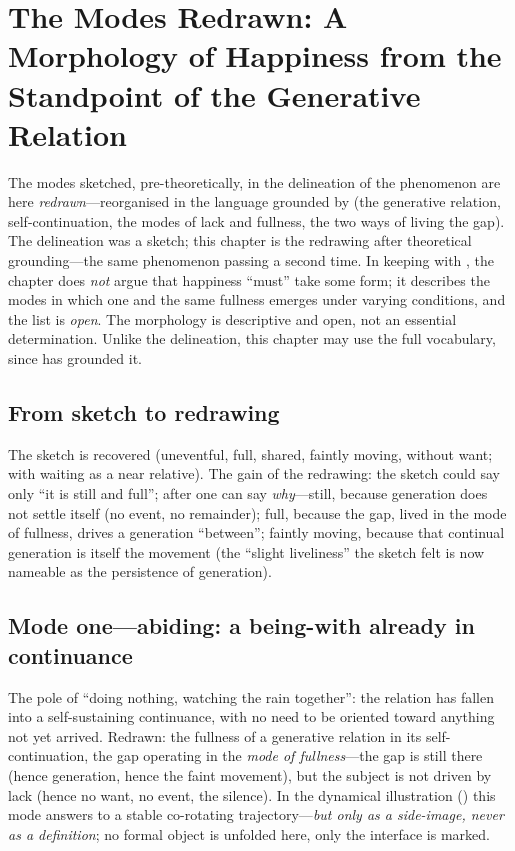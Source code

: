 \section{The Modes Redrawn: A Morphology of Happiness from the Standpoint of the Generative Relation}
\label{p19:sec:modes}

\noindent
The modes sketched, pre-theoretically, in the delineation of the phenomenon are here \emph{redrawn}---reorganised in the language grounded by  (the generative relation, self-continuation, the modes of lack and fullness, the two ways of living the gap). The delineation was a sketch; this chapter is the redrawing after theoretical grounding---the same phenomenon passing a second time. In keeping with , the chapter does \emph{not} argue that happiness ``must'' take some form; it describes the modes in which one and the same fullness emerges under varying conditions, and the list is \emph{open}. The morphology is descriptive and open, not an essential determination. Unlike the delineation, this chapter may use the full vocabulary, since  has grounded it.

\subsection{From sketch to redrawing}
\label{p19:sub:modes-sketch}

The sketch is recovered (uneventful, full, shared, faintly moving, without want; with waiting as a near relative). The gain of the redrawing: the sketch could say only ``it is still and full''; after  one can say \emph{why}---still, because generation does not settle itself (no event, no remainder); full, because the gap, lived in the mode of fullness, drives a generation ``between''; faintly moving, because that continual generation is itself the movement (the ``slight liveliness'' the sketch felt is now nameable as the persistence of generation).

\subsection{Mode one---abiding: a being-with already in continuance}
\label{p19:sub:modes-abiding}

The pole of ``doing nothing, watching the rain together'': the relation has fallen into a self-sustaining continuance, with no need to be oriented toward anything not yet arrived. Redrawn: the fullness of a generative relation in its self-continuation, the gap operating in the \emph{mode of fullness}---the gap is still there (hence generation, hence the faint movement), but the subject is not driven by lack (hence no want, no event, the silence). In the dynamical illustration () this mode answers to a stable co-rotating trajectory---\emph{but only as a side-image, never as a definition}; no formal object is unfolded here, only the interface is marked.

